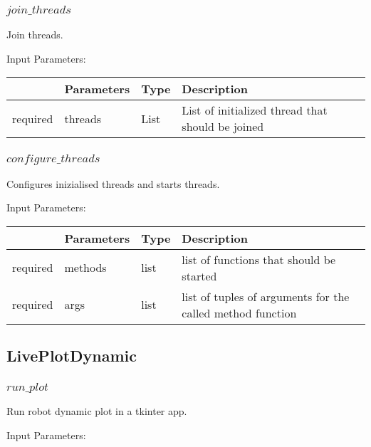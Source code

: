 \documentclass[
	ngerman,
	accentcolor=9c,%
	type=intern,
	marginpar=false
	]{tudapub}
\begin{document}
\subsubsection{$join\_threads$}
\noindent Join threads.


\vspace{0.5cm}
\noindent Input Parameters:
\vspace{0.5cm}

\begin{tabular}{|p{}|p{}|p{}| p{}|}
\hline
 & \textbf{Parameters} & \textbf{Type} & \textbf{Description} \\
\hline
required & threads & List & List of initialized thread that should be joined \\
\hline
\end{tabular}
\vspace{1cm}

\subsubsection{$configure\_threads$}
\noindent Configures inizialised threads and starts threads.


\vspace{0.5cm}
\noindent Input Parameters:
\vspace{0.5cm}

\begin{tabular}{|p{}|p{}|p{}| p{}|}
\hline
 & \textbf{Parameters} & \textbf{Type} & \textbf{Description} \\
\hline
required & methods & list & list of functions that should be started \\
\hline
required & args & list & list of tuples of arguments for the called method function \\
\hline
\end{tabular}
\vspace{1cm}


\subsection{LivePlotDynamic}
\subsubsection{$run\_plot$}
\noindent Run robot dynamic plot in a tkinter app.


\vspace{0.5cm}
\noindent Input Parameters:
\vspace{0.5cm}
\end{document}
